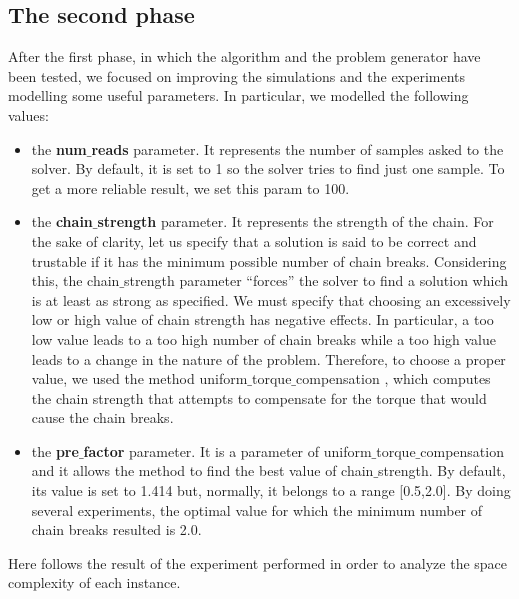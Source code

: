 \documentclass[oneside,a4paper]{article}
\begin{document}
\subsection{The second phase}
After the first phase, in which the algorithm and the problem generator have been tested, we focused on improving the simulations and the experiments modelling some useful parameters. In particular, we modelled the following values:\\
\begin{itemize}
    \item the \textbf{num$\_$reads} parameter. It represents the number of samples asked to the solver. By default, it is set to 1 so the solver tries to find just one sample. To get a more reliable result, we set this param to 100.
    \item the \textbf{chain$\_$strength} parameter. It represents the strength of the chain. For the sake of clarity, let us specify that a solution is said to be correct and trustable if it has the minimum possible number of chain breaks. Considering this, the chain$\_$strength parameter “forces” the solver to find a solution which is at least as strong as specified. We must specify that choosing an excessively low or high value of chain strength has negative effects. In particular, a too low value leads to a too high number of chain breaks while a too high value leads to a change in the nature of the problem\cite{WebSite4}. Therefore, to choose a proper value, we used the method uniform$\_$torque$\_$compensation \cite{WebSite5}, which computes the chain strength that attempts to compensate for the torque that would cause the chain breaks.
    \item the \textbf{pre$\_$factor} parameter. It is a parameter of uniform$\_$torque$\_$compensation and it allows the method to find the best value of chain$\_$strength. By default, its value is set to 1.414 but, normally, it belongs to a range [0.5,2.0]. By doing several experiments, the optimal value for which the minimum number of chain breaks resulted is 2.0.\\
\end{itemize}
Here follows the result of the experiment performed in order to analyze the space complexity of each instance.
\end{document}

